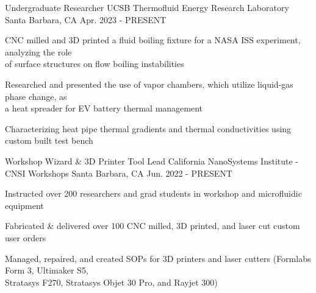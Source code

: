 \begin{cventries}
\cventry
{Undergraduate Researcher} %
{UCSB Thermofluid Energy Research Laboratory} %
{Santa Barbara, CA} %
{Apr. 2023 - PRESENT} %
{ %
\begin{cvitems}   
\item {CNC milled and 3D printed a fluid boiling fixture for a NASA ISS experiment, analyzing the role \\ of surface structures on flow boiling instabilities}
\item {Researched and presented the use of vapor chambers, which utilize liquid-gas phase change, as \\ a heat spreader for EV battery thermal management}
\item {Characterizing heat pipe thermal gradients and thermal conductivities using custom built test bench}
\end{cvitems}
}



\cventry
{Workshop Wizard \& 3D Printer Tool Lead} %
{California NanoSystems Institute - CNSI Workshops} %
{Santa Barbara, CA} %
{Jun. 2022 - PRESENT} %
{ %
\begin{cvitems}
\item {Instructed over 200 researchers and grad students in workshop and microfluidic equipment}
\item {Fabricated \& delivered over 100 CNC milled, 3D printed, and laser cut custom user orders}
\item {Managed, repaired, and created SOPs for 3D printers and laser cutters  (Formlabs Form 3,  Ultimaker S5, \\ Stratasys F270, Stratasys Objet 30 Pro, and Rayjet 300)}
\end{cvitems}
}






\end{cventries}
